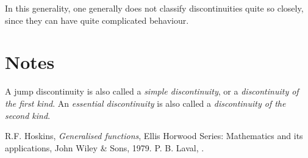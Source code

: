 \documentclass[12pt]{article}
\begin{document}
In this generality, one generally does not classify discontinuities quite so closely, since they can have quite complicated behaviour.

\section*{Notes}
A jump discontinuity is also called a \emph{simple discontinuity}, or  a 
\emph{ discontinuity of the first kind}.  
An  \emph{essential discontinuity} is also called a 
\emph{discontinuity of the second kind}.


\begin{thebibliography}{9}
R.F. Hoskins, \emph{Generalised functions}, 
Ellis Horwood Series: Mathematics and its applications, 
John Wiley \& Sons, 1979.
 P. B. Laval, 
.
 \end{thebibliography}
\end{document}
